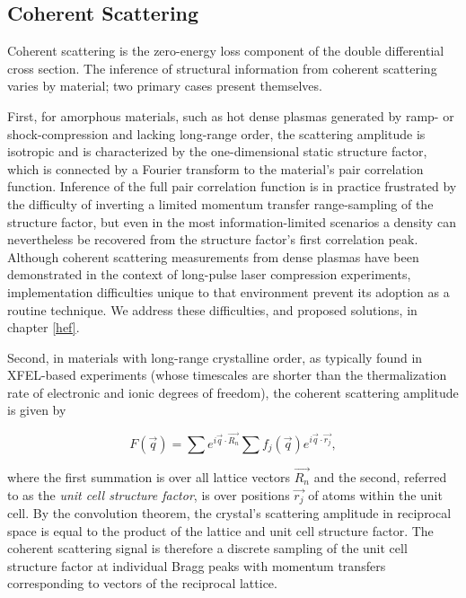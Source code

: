 \documentclass [11pt, proquest, article] {uwthesis}[2016/11/22]
\begin{document}
\label{coh}
\subsection{Coherent Scattering}
Coherent scattering is the zero-energy loss component of the double differential cross section.  The inference of structural information from coherent scattering varies by material; two primary cases present themselves.



First, for amorphous materials, such as hot dense plasmas generated by ramp- or shock-compression and lacking long-range order, the scattering amplitude is isotropic and is characterized by the one-dimensional static structure factor, which is connected by a Fourier transform to the material's pair correlation function. Inference of the full pair correlation function is in practice frustrated by the difficulty of inverting a limited momentum transfer range-sampling of the structure factor, but even in the most information-limited scenarios a density can nevertheless be recovered from the structure factor's first correlation peak. Although coherent scattering measurements from dense plasmas have been demonstrated in the context of long-pulse laser compression experiments, implementation difficulties unique to that environment prevent its adoption as a routine technique. We address these difficulties, and proposed solutions, in chapter \ref{hef}. \cite{ma2013x}

Second, in materials with long-range crystalline order, as typically found in XFEL-based experiments (whose timescales are shorter than the thermalization rate of electronic and ionic degrees of freedom), the coherent scattering amplitude is given by

\begin{equation}
F(\vec{q}) = \sum e^{i \vec{q} \cdot \vec{R_n}} \sum f_j(\vec{q}) e^{i \vec{q} \cdot \vec{r_j}},
\end{equation}

where the first summation is over all lattice vectors $\vec{R_n}$ and the second, referred to as the \emph{unit cell structure factor}, is over positions $\vec{r_j}$ of atoms within the unit cell. By the convolution theorem, the crystal's scattering amplitude in reciprocal space is equal to the product of the lattice and unit cell structure factor. The coherent scattering signal is therefore a discrete sampling of the unit cell structure factor at individual Bragg peaks with momentum transfers corresponding to vectors of the reciprocal lattice.
\end{document}
